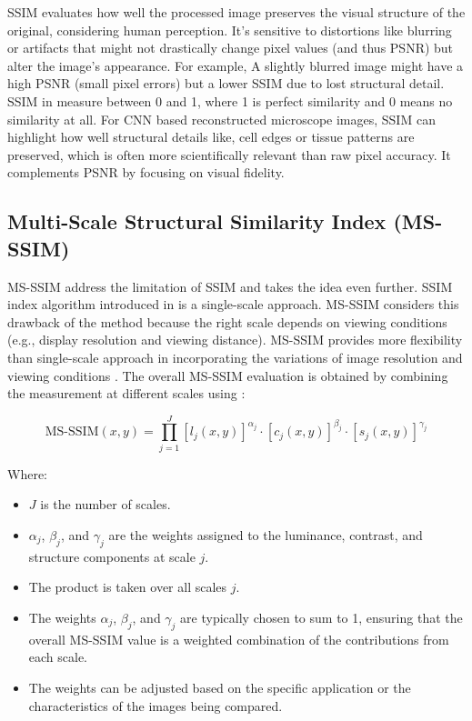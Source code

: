 \documentclass[11pt,
  paper=a4, 
  bibliography=totocnumbered,
	captions=tableheading,
	BCOR=10mm
]{scrreprt}
\theoremstyle{definition}
\begin{document}
\vspace{1cm}
\noindent



SSIM evaluates how well the processed image preserves the visual structure of the original, considering human perception. 
It’s sensitive to distortions like blurring or artifacts that might not drastically change pixel values (and thus PSNR) 
but alter the image’s appearance. For example, A slightly blurred image might have a high PSNR (small pixel errors) but a 
lower SSIM due to lost structural detail. SSIM in measure between 0 and 1, where 1 is perfect similarity and 0 means no similarity at all. 
For CNN based reconstructed microscope images, SSIM can highlight how well structural details like, cell edges or tissue patterns are preserved, 
which is often more scientifically relevant than raw pixel accuracy. It complements PSNR by focusing on visual fidelity.



\subsection{Multi-Scale Structural Similarity Index (MS-SSIM)}



MS-SSIM address the limitation of SSIM and takes the idea even further.  
SSIM index algorithm introduced in \cite{ssim_paper} is a single-scale approach. 
MS-SSIM considers this drawback of the method because the right scale depends on viewing conditions (e.g., display resolution and viewing distance). 
MS-SSIM provides more flexibility than single-scale approach in incorporating the variations of image resolution and viewing conditions \cite{ms-ssim}. 
The overall MS-SSIM evaluation is obtained by combining the measurement at different scales using : 

\begin{equation}
\label{eq:MS-SSIM}
\text{MS-SSIM}(x, y) = \prod_{j=1}^{J} [l_j(x, y)]^{\alpha_j} \cdot [c_j(x, y)]^{\beta_j} \cdot [s_j(x, y)]^{\gamma_j}
\end{equation}

Where:
\begin{itemize}
	\item \(J\) is the number of scales.
	\item \(\alpha_j\), \(\beta_j\), and \(\gamma_j\) are the weights assigned to the luminance, contrast, and structure components at scale \(j\).
	\item The product is taken over all scales \(j\).
	\item The weights \(\alpha_j\), \(\beta_j\), and \(\gamma_j\) are typically chosen to sum to 1, ensuring that the overall MS-SSIM value is a weighted combination of the contributions from each scale.
	\item The weights can be adjusted based on the specific application or the characteristics of the images being compared.
\end{itemize}
\end{document}
